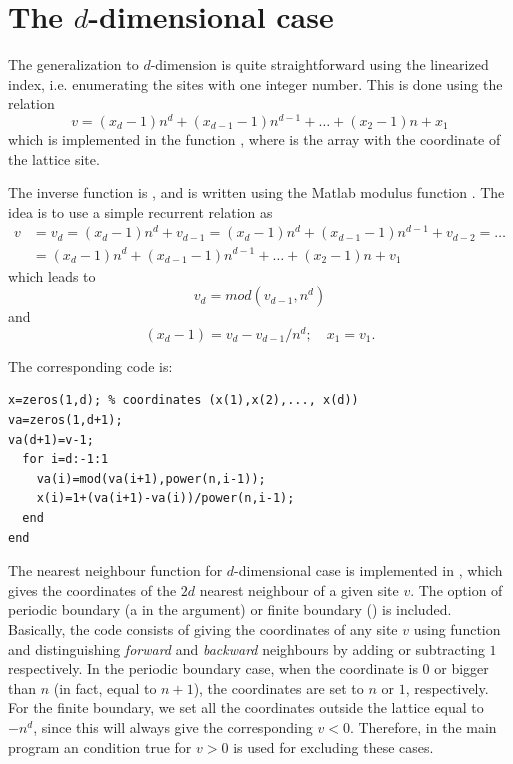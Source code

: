 \section{The $d$-dimensional case}

The generalization to $d$-dimension is quite straightforward using the linearized index, i.e. enumerating the sites with one integer number. This is done using the relation
\[
v=(x_d-1)n^d+(x_{d-1}-1)n^{d-1}+\ldots+(x_2-1)n+x_1
\]
which is implemented in the function , where  is the array with the coordinate of the lattice site.



The inverse function is , and is written using the Matlab modulus function . The idea is to use a simple recurrent relation as
\[
\begin{aligned}
v & =v_d=(x_d-1)n^d+v_{d-1}=(x_d-1)n^d+(x_{d-1}-1)n^{d-1}+v_{d-2}=\ldots \\
  & =(x_d-1)n^d+(x_{d-1}-1)n^{d-1}+\ldots+(x_2-1)n+v_1
\end{aligned}
\]
which leads to
\[
v_d=mod(v_{d-1}, n^d)
\]
and
\[
(x_d-1)=v_d-v_{d-1}/n^d; \quad  x_1=v_1.
\]

The corresponding code is:
\begin{lstlisting}
x=zeros(1,d); % coordinates (x(1),x(2),..., x(d))
va=zeros(1,d+1);
va(d+1)=v-1;
  for i=d:-1:1
    va(i)=mod(va(i+1),power(n,i-1));
    x(i)=1+(va(i+1)-va(i))/power(n,i-1);
  end
end
\end{lstlisting}

The nearest neighbour function for $d$-dimensional case is implemented in ,
which gives the coordinates of the $2d$ nearest neighbour of a given site $v$.
The option of periodic boundary (a  in the argument) or finite boundary () is included.
Basically, the code consists of giving the coordinates of any site $v$ using  function and
distinguishing \emph{forward} and \emph{backward} neighbours by adding or subtracting $1$ respectively.
In the periodic boundary case, when the coordinate is $0$ or bigger than $n$ (in fact, equal to $n+1$), the coordinates are set to
$n$ or $1$, respectively. For the finite boundary, we set all the coordinates outside the lattice equal to $-n^d$,
since this will always give the corresponding $v<0$. Therefore, in the main program an  condition true for $v>0$ is used for excluding these cases.


